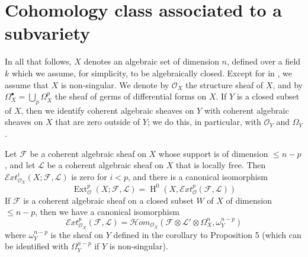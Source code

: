 \section{Cohomology class associated to a subvariety}\label{fga1-4}

In all that follows, $X$ denotes an algebraic set of dimension $n$, defined over a field $k$ which we assume, for simplicity, to be algebraically closed.
Except for in , we assume that $X$ is non-singular.
We denote by $\mathcal{O}_X$ the structure sheaf of $X$, and by $\Omega_X^\bullet=\bigcup_p\Omega_X^p$ the sheaf of germs of differential forms on $X$.
If $Y$ is a closed subset of $X$, then we identify coherent algebraic sheaves on $Y$ with coherent algebraic sheaves on $X$ that are zero outside of $Y$;
we do this, in particular, with $\mathcal{O}_Y$ and $\Omega_Y$.


\begin{lemma}\label{fga1-lemma-1}
  Let $\mathcal{F}$ be a coherent algebraic sheaf on $X$ whose support is of dimension $\leqslant n-p$, and let $\mathcal{L}$ be a coherent algebraic sheaf on $X$ that is locally free.
  Then $\mathcal{E}xt_{\mathcal{O}_X}^i(X;\mathcal{F},\mathcal{L})$ is zero for $i<p$, and there is a canonical isomorphism
  \begin{equation}\tag{4.1}\label{fga1-equation-4.1}
    \operatorname{Ext}_\mathcal{O}^p(X;\mathcal{F},\mathcal{L}) = \operatorname{H}^0(X,\mathcal{E}xt_\mathcal{O}^p(\mathcal{F},\mathcal{L}))
  \end{equation}
  If $\mathcal{F}$ is a coherent algebraic sheaf on a closed subset $W$ of $X$ of dimension $\leqslant n-p$, then we have a canonical isomorphism
  \begin{equation}\tag{4.1 bis}\label{fga1-equation-4.1bis}
    \mathcal{E}xt_{\mathcal{O}_X}^p(\mathcal{F},\mathcal{L}) = \mathcal{H}om_{\mathcal{O}_X}(\mathcal{F}\otimes\mathcal{L}'\otimes\Omega_X^n,\omega_Y^{n-p})
  \end{equation}
  where $\omega_Y^{n-p}$ is the sheaf on $Y$ defined in the corollary to Proposition 5  (which can be identified with $\Omega_Y^{n-p}$ if $Y$ is non-singular).
\end{lemma}

